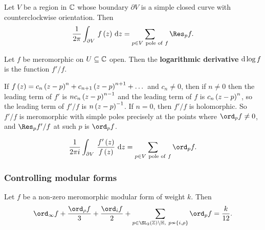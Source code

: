 \begin{theorem}
Let $ V $ be a region in $ \mathbb{C} $ whose boundary $ \partial V $ is a simple closed curve with counterclockwise orientation. Then
$$ \dfrac{1}{2\pi}\intd{\partial V}{}{f\br{z}}{z} = \sum_{p \in V \ \text{pole of} \ f} \Res_p f. $$
\end{theorem}

\begin{definition}
Let $ f $ be meromorphic on $ U \subseteq \mathbb{C} $ open. Then the \textbf{logarithmic derivative} $ \mathrm{d}\log f $ is the function $ f' / f $.
\end{definition}

If $ f\br{z} = c_n\br{z - p}^n + c_{n + 1}\br{z - p}^{n + 1} + \dots $ and $ c_n \ne 0 $, then if $ n \ne 0 $ then the leading term of $ f' $ is $ nc_n\br{z - p}^{n - 1} $ and the leading term of $ f $ is $ c_n\br{z - p}^n $, so the leading term of $ f' / f $ is $ n\br{z - p}^{-1} $. If $ n = 0 $, then $ f' / f $ is holomorphic. So $ f' / f $ is meromorphic with simple poles precisely at the points where $ \ord_p f \ne 0 $, and $ \Res_p f' / f $ at such $ p $ is $ \ord_p f $.

\begin{theorem}
$$ \dfrac{1}{2\pi i}\intd{\partial V}{}{\dfrac{f'\br{z}}{f\br{z}}}{z} = \sum_{p \in V \ \text{pole of} \ f} \ord_p f. $$
\end{theorem}

\pagebreak

\subsubsection{Controlling modular forms}

\begin{theorem}[$ k / 12 $-formula]
Let $ f $ be a non-zero meromorphic modular form of weight $ k $. Then
$$ \ord_\infty f + \dfrac{\ord_\rho f}{3} + \dfrac{\ord_i f}{2} + \sum_{p \in \SL_2\br{\ZZ} \backslash \HH, \ p \nsim \cbr{i, \rho}} \ord_p f = \dfrac{k}{12}. $$
\end{theorem}


